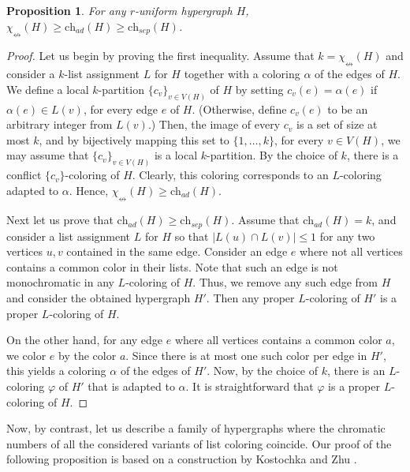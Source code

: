 \documentclass[12pt]{article}
\newtheorem{proposition}[theorem]{Proposition}
\newcommand{\single}{\chi_{\nleftrightarrow}}
\newcommand{\ch}{\mathrm{ch}}
\newcommand{\1}{\mathds{1}}
\begin{document}
\begin{proposition}
\label{prop:hyperinequality}
	For any $r$-uniform hypergraph $H$,
	$\single(H) \geq \ch_{ad}(H) \geq \ch_{sep}(H)$.
\end{proposition}	
\begin{proof}
	Let us begin by proving the first inequality. Assume that $k = \single(H)$ and consider
	a $k$-list assignment $L$ for $H$ together 
	with a coloring $\alpha$ of the edges of
	$H$. We define a local $k$-partition $\{c_v\}_{v \in V(H)}$ of $H$ by setting $c_v(e) = \alpha(e)$ 
	if $\alpha(e) \in L(v)$, for every
	edge $e$ of $H$. (Otherwise, define $c_v(e)$ to be an arbitrary integer from
	$L(v)$.) Then, the image of every $c_v$ is a set of size at most $k$, and by
	bijectively mapping this set %
	to $\{1,\dots, k\}$, for every $v \in V(H)$, %
	we may assume that
	$\{c_v\}_{v\in V(H)}$ is a local $k$-partition. By the choice of $k$, there is
	a conflict $\{c_v\}$-coloring of $H$. Clearly, this coloring corresponds to an
	$L$-coloring adapted to $\alpha$. Hence, $\single(H) \geq \ch_{ad}(H)$.

	Next let us prove that $\ch_{ad}(H) \geq \ch_{sep}(H)$. Assume that
	$\ch_{ad}(H) =k$, and consider a list assignment $L$ for $H$ so that
	$|L(u) \cap L(v)| \leq 1$ for any two vertices $u,v$ contained in the same edge.
	Consider an edge $e$ where not all vertices contains a common color in their lists. Note that
	such an edge is not monochromatic in any $L$-coloring of $H$. Thus, we remove
	any such edge from $H$ and consider the obtained hypergraph $H'$. 
	Then any proper
	$L$-coloring of $H'$ is a proper $L$-coloring of $H$.

	On the other hand, for any edge $e$ where all vertices contains a common color 
	$a$, we color $e$ by the color $a$. Since there is at most one such color per edge
	in $H'$, this yields a coloring $\alpha$ of the edges of $H'$. Now, by the choice of
	$k$, there is an $L$-coloring $\varphi$ of $H'$ that is adapted to $\alpha$. It
	is straightforward that $\varphi$ is a proper $L$-coloring of $H$.
\end{proof}



Now, by contrast, let us  describe a family of hypergraphs where the chromatic numbers of
all the considered variants of list coloring coincide.
Our proof of the following proposition is based on a construction by 
	Kostochka and Zhu
	\cite{KostochkaZhu}.
	
\end{document}
